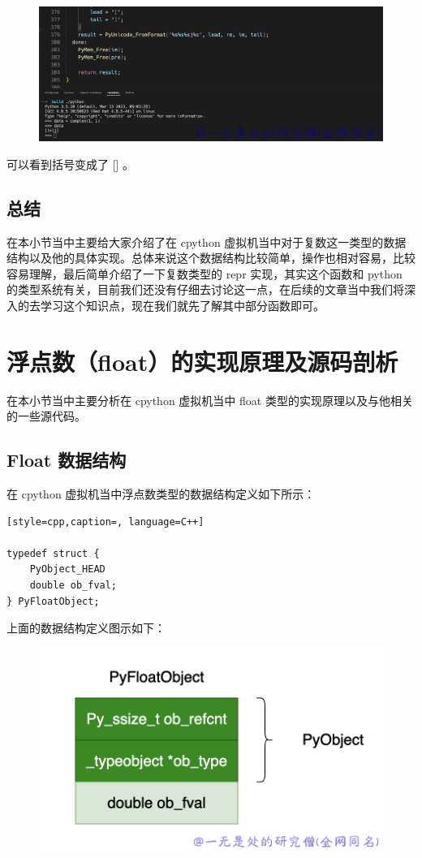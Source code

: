     \begin{figure}[h]
        \centering
            \includegraphics[scale=.3]{images/24-int.png}
            \caption{ }
        \label{fig:my_label}
    \end{figure}
    
可以看到括号变成了 [] 。
\subsection{总结}
在本小节当中主要给大家介绍了在 cpython 虚拟机当中对于复数这一类型的数据结构以及他的具体实现。总体来说这个数据结构比较简单，操作也相对容易，比较容易理解，最后简单介绍了一下复数类型的 repr 实现，其实这个函数和 python 的类型系统有关，目前我们还没有仔细去讨论这一点，在后续的文章当中我们将深入的去学习这个知识点，现在我们就先了解其中部分函数即可。
\section{浮点数（float）的实现原理及源码剖析}
在本小节当中主要分析在 cpython 虚拟机当中 float 类型的实现原理以及与他相关的一些源代码。
\subsection{Float 数据结构}
在 cpython 虚拟机当中浮点数类型的数据结构定义如下所示：
\begin{lstlisting}[style=cpp,caption=, language=C++]

typedef struct {
    PyObject_HEAD
    double ob_fval;
} PyFloatObject;
\end{lstlisting}
上面的数据结构定义图示如下：

    \begin{figure}[h]
        \centering
            \includegraphics[scale=.4]{images/12-tuple.png}
            \caption{ }
        \label{fig:my_label}
    \end{figure}
    
